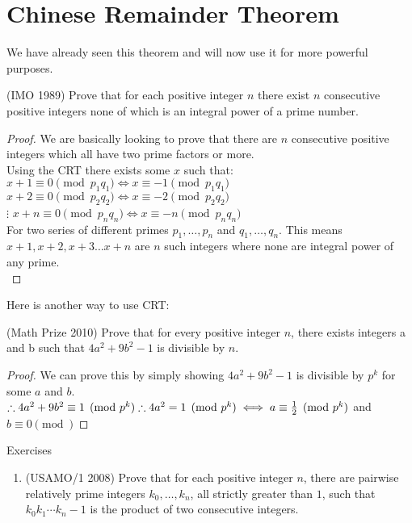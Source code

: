 \section{Chinese Remainder Theorem}
We have already seen this theorem and will now use it for more powerful purposes.\\
\begin{example}
(IMO 1989) Prove that for each positive integer $n$ there exist $n$ consecutive positive integers none of which is an integral power of a prime number.
\end{example}
\begin{proof}
    We are basically looking to prove that there are $n$ consecutive positive integers which all have two prime factors or more.\\
    Using the CRT there exists some $x$ such that:\\
    $x+1 \equiv 0 \pmod{p_1q_1} \iff x \equiv -1 \pmod{p_1q_1}$\\
    $x+2 \equiv 0 \pmod{p_2q_2} \iff x \equiv -2 \pmod{p_2q_2}$\\
    $\vdots$
    $x+n \equiv 0 \pmod{p_nq_n} \iff x \equiv -n \pmod{p_nq_n}$\\
    For two series of different primes $p_1,\dots,p_n$ and $q_1, \dots, q_n$. This means $x+1, x+2, x+3 \dots x+n$ are $n$ such integers where none are integral power of any prime.\\ 
\end{proof}
Here is another way to use CRT:\\
\begin{example}
    (Math Prize 2010) Prove that for every positive integer $n$, there exists integers a and b such that $4a^2 + 9b^2 - 1$ is divisible by $n$.  
\end{example}
\begin{proof}
    We can prove this by simply showing $4a^2+9b^2-1$ is divisible by $p^k$ for some $a$ and $b$.\\
    $\therefore 4a^2+9b^2 \equiv 1 \pmod{p^k}\\
    \therefore 4a^2=1\pmod{p^k} \iff a \equiv \frac{1}{2} \pmod{p^k}$ and $b \equiv 0 \pmod{}$
\end{proof}
\begin{xcb}{Exercises}
\begin{enumerate}
    \item (USAMO/1 2008) Prove that for each positive integer $n$, there are pairwise relatively prime integers
$k_0,\dots, k_n$, all strictly greater than $1$, such that $k_0k_1 \cdots k_n - 1$ is the product of two
consecutive integers.
\end{enumerate}
\end{xcb}